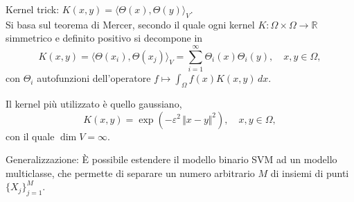 \documentclass[10pt]{beamer}
\theoremstyle{definition}
\theoremstyle{plain}
\def\R{\mathbb R}
\def\norm#1{\Vert #1\Vert}
\begin{document}
\begin{frame}
\alert{Kernel trick}: $K(x,y) = \langle \Theta(x), \Theta(y)\rangle_V$.\\
Si basa sul \alert{teorema di Mercer}, secondo il quale ogni kernel $K:\Omega\times\Omega\to\R$ simmetrico e definito positivo si decompone in
$$
K(x,y) = \langle \Theta(x_i), \Theta(x_j)\rangle_V = \sum_{i=1}^\infty \Theta_i(x)\Theta_i(y), \quad x,y\in\Omega,
$$
con $\Theta_i$ autofunzioni dell’operatore $f\mapsto\int_\Omega f(x)K(x,y)\,dx$.

\bigskip
Il kernel più utilizzato è quello gaussiano,
$$
K(x,y) = \exp(-\varepsilon^2\,\norm{x-y}^2),\quad x,y\in\Omega,
$$
con il quale $\dim V =\infty$.

\bigskip
\alert{Generalizzazione}: È possibile estendere il modello binario SVM ad un modello multiclasse, che permette di separare un numero arbitrario $M$ di insiemi di punti $\{X_j\}_{j=1}^M$.
\end{frame}

%
% 
\end{document}
